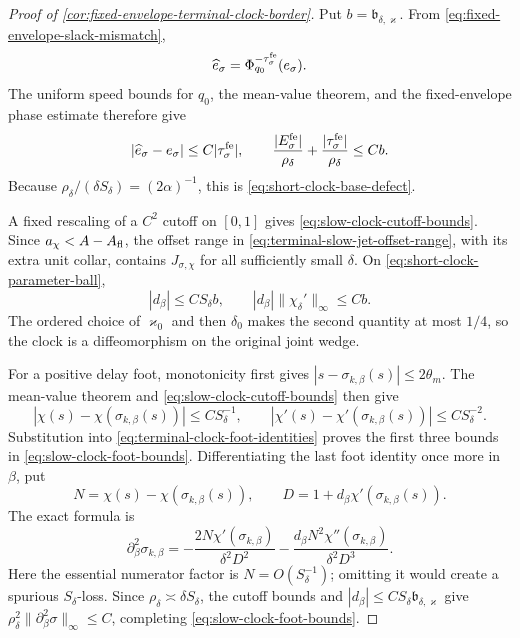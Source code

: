 \begin{proof}[Proof of
\cref{cor:fixed-envelope-terminal-clock-border}]
Put \(b=\mathfrak b_{\delta,\varkappa}\).  From
\cref{eq:fixed-envelope-slack-mismatch},
\[
 \widehat e_\sigma
 =\Phi_{q_0}^{-\tau_\sigma^{\rm fe}}(e_\sigma).
\]
The uniform speed bounds for \(q_0\), the mean-value theorem, and the
fixed-envelope phase estimate therefore give
\[
 |\widehat e_\sigma-e_\sigma|
 \le C|\tau_\sigma^{\rm fe}|,\qquad
 \frac{|E_\sigma^{\rm fe}|}{\rho_\delta}
 +\frac{|\tau_\sigma^{\rm fe}|}{\rho_\delta}
 \le Cb.
\]
Because \(\rho_\delta/(\delta S_\delta)=(2\alpha)^{-1}\), this is
\cref{eq:short-clock-base-defect}.

A fixed rescaling of a \(C^2\) cutoff on \([0,1]\) gives
\cref{eq:slow-clock-cutoff-bounds}.  Since
\(a_\chi<A-A_{\rm fl}\), the offset range in
\cref{eq:terminal-slow-jet-offset-range}, with its extra unit collar,
contains \(J_{\sigma,\chi}\) for all sufficiently small \(\delta\).
On \cref{eq:short-clock-parameter-ball},
\[
 |d_\beta|\le CS_\delta b,
 \qquad
 |d_\beta|\|\chi_\delta'\|_\infty\le Cb.
\]
The ordered choice of \(\varkappa_0\) and then \(\delta_0\) makes the
second quantity at most \(1/4\), so the clock is a diffeomorphism on the
original joint wedge.

For a positive delay foot, monotonicity first gives
\(|s-\sigma_{k,\beta}(s)|\le 2\theta_m\).  The mean-value theorem and
\cref{eq:slow-clock-cutoff-bounds} then give
\[
 |\chi(s)-\chi(\sigma_{k,\beta}(s))|\le C S_\delta^{-1},
 \qquad
 |\chi'(s)-\chi'(\sigma_{k,\beta}(s))|
       \le C S_\delta^{-2}.
\]
Substitution into \cref{eq:terminal-clock-foot-identities} proves the
first three bounds in \cref{eq:slow-clock-foot-bounds}.  Differentiating
the last foot identity once more in \(\beta\), put
\[
 N=\chi(s)-\chi(\sigma_{k,\beta}(s)),\qquad
 D=1+d_\beta\chi'(\sigma_{k,\beta}(s)).
\]
The exact formula is
\begin{equation}
 \partial_\beta^2\sigma_{k,\beta}
 =-\frac{2N\chi'(\sigma_{k,\beta})}{\delta^2D^2}
  -\frac{d_\beta N^2\chi''(\sigma_{k,\beta})}
          {\delta^2D^3}.                       \label{eq:proof-slow-clock-second-foot}
\end{equation}
Here the essential numerator factor is
\(N=O(S_\delta^{-1})\); omitting it would create a spurious
\(S_\delta\)-loss.  Since
\(\rho_\delta\asymp\delta S_\delta\), the cutoff bounds and
\(|d_\beta|\le CS_\delta\mathfrak b_{\delta,\varkappa}\) give
\(\rho_\delta^2\|\partial_\beta^2\sigma\|_\infty\le C\), completing
\cref{eq:slow-clock-foot-bounds}.


\end{proof}
